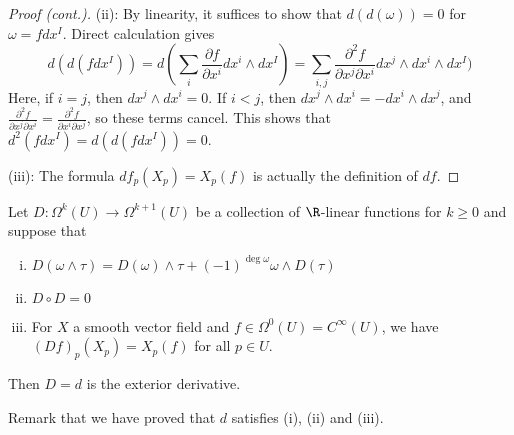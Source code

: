 \begin{frame}
  \begin{proof}[Proof (cont.)]
    (ii): By linearity, it suffices to
    show that $d(d(\omega)) = 0$ for $\omega = fdx^I$.
    Direct calculation gives
    \begin{displaymath}
      d(d(fdx^I)) = d(\sum_i 
      \frac{\partial f}{\partial x^i} dx^i \wedge dx^I)
      =
      \sum_{i, j}
      \frac{\partial^2 f}{\partial x^j \partial x^i} dx^j \wedge dx^i \wedge dx^I)
    \end{displaymath}
    Here, if $i = j$, then $dx^j \wedge dx^i = 0$. If $i < j$, then
    $dx^j \wedge dx^i = - dx^i \wedge dx^j$, and 
    $
    \frac{\partial^2 f}{\partial x^j \partial x^i} = 
    \frac{\partial^2 f}{\partial x^i \partial x^j}
    $,
    so these terms cancel. This shows that $d^2(fdx^I) = d(d(fdx^I)) = 0$.

    \vspace{1cm}

    (iii): The formula $df_p(X_p) = X_p(f)$ is actually the definition of $df$.
  \end{proof}
\end{frame}
\begin{frame}
  \begin{prop}
    Let $D \colon \Omega^k(U) \to \Omega^{k+1}(U)$ be a collection
    of $\R$-linear functions for $k \ge 0$ and suppose that
    \begin{enumerate}[(i)]
      \item $D(\omega \wedge \tau)= D(\omega) \wedge \tau + (-1)^{\deg \omega}
        \omega \wedge D(\tau)$
      \item $D \circ D = 0$
      \item For $X$ a smooth vector field and $f \in \Omega^0(U) = C^{\infty}(U)$,
        we have $(Df)_p(X_p) = X_p(f)$ for all $p \in U$.
    \end{enumerate}
    Then $D = d$ is the exterior derivative.
  \end{prop}
  Remark that we have proved that $d$ satisfies (i), (ii) and (iii).
\end{frame}

